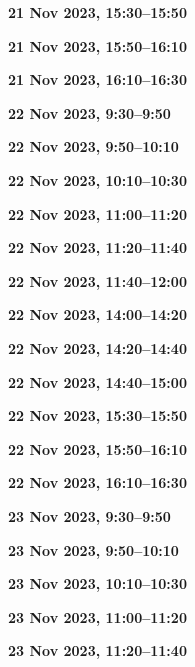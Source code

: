 \documentclass[12pt]{extbook}
\newcommand{\breaktime}[1]{
\bigskip
\begin{center}
\Large\bfseries ***** Break #1 *****
\end{center}
\bigskip}
\renewcommand{\breaktime}[1]{}
\newcommand{\abstract}[2]{{
\bigskip
\begin{center}
\large\bfseries #1
\end{center}}
\par

\clearpage
}
\begin{document}
\abstract{21 Nov 2023, 15:30--15:50}{abstracts/Kipfer} %
\abstract{21 Nov 2023, 15:50--16:10}{abstracts/vanRooyen} %
\abstract{21 Nov 2023, 16:10--16:30}{abstracts/Gisiger} %


\abstract{22 Nov 2023, 9:30--9:50}{abstracts/Jacops} %
\abstract{22 Nov 2023, 9:50--10:10}{abstracts/Tomonaga} %
\abstract{22 Nov 2023, 10:10--10:30}{abstracts/Kim} %

\breaktime{30 min}

\abstract{22 Nov 2023, 11:00--11:20}{abstracts/vanLeeuw} %
\abstract{22 Nov 2023, 11:20--11:40}{abstracts/Currle} %
\abstract{22 Nov 2023, 11:40--12:00}{abstracts/Finger}

\breaktime{ / Lunch}


\abstract{22 Nov 2023, 14:00--14:20}{abstracts/Schilling} %
\abstract{22 Nov 2023, 14:20--14:40}{abstracts/Brennwald} %
\abstract{22 Nov 2023, 14:40--15:00}{abstracts/Blanc} %


\breaktime{30 min}

\abstract{22 Nov 2023, 15:30--15:50}{abstracts/Marion} %
\abstract{22 Nov 2023, 15:50--16:10}{abstracts/Picard} %
\abstract{22 Nov 2023, 16:10--16:30}{abstracts/Engelhardt} %



\abstract{23 Nov 2023, 9:30--9:50}{abstracts/Musy} %
\abstract{23 Nov 2023, 9:50--10:10}{abstracts/Rinaldi} %
\abstract{23 Nov 2023, 10:10--10:30}{abstracts/GroegerTrampe} %

\breaktime{30 min}

\abstract{23 Nov 2023, 11:00--11:20}{abstracts/Iwe} %
\abstract{23 Nov 2023, 11:20--11:40}{abstracts/Slagter} %
\end{document}
